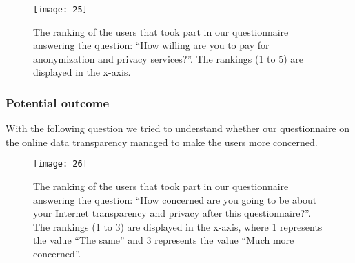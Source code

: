 \begin{figure}[H]
\centering
\texttt{[image: 25]}
\caption{The ranking of the users that took part in our questionnaire answering
the question: ``How willing are you to pay for anonymization and privacy 
services?''. The rankings (1 to 5) are displayed in the x-axis.}
\end{figure}

\subsubsection{Potential outcome}

With the following question we tried to understand whether our questionnaire on 
the online data transparency managed to make the users more concerned.  

\begin{figure}[H]
\centering
\texttt{[image: 26]}
\caption{The ranking of the users that took part in our questionnaire answering
the question: ``How concerned are you going to be about your Internet 
transparency and privacy after this questionnaire?''. The
rankings (1 to 3) are displayed in the x-axis, where 1 represents the value 
``The same'' and 3 represents the value ``Much more concerned''.}
\end{figure}

